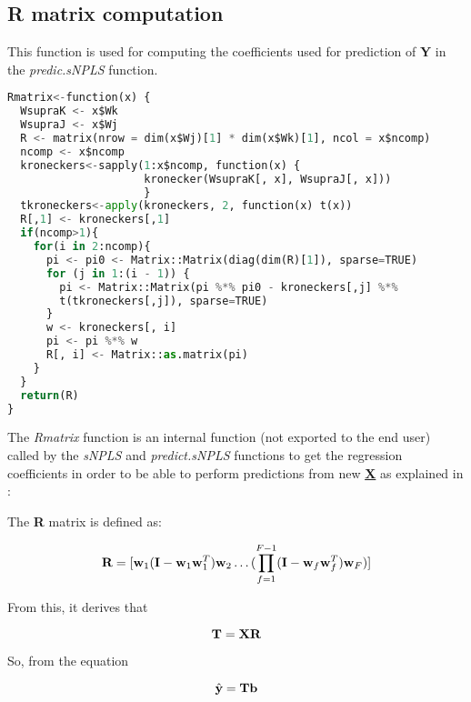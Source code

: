 \subsection{R matrix computation}
This function is used for computing the coefficients used for prediction of \textbf{Y} in the \textit{predic.sNPLS} function.
\vspace{15pt}
\begin{scriptsize}
\begin{lstlisting}[language=Python, caption=R matrix function]
Rmatrix<-function(x) {
  WsupraK <- x$Wk
  WsupraJ <- x$Wj
  R <- matrix(nrow = dim(x$Wj)[1] * dim(x$Wk)[1], ncol = x$ncomp)
  ncomp <- x$ncomp
  kroneckers<-sapply(1:x$ncomp, function(x) {
                     kronecker(WsupraK[, x], WsupraJ[, x]))
                     }
  tkroneckers<-apply(kroneckers, 2, function(x) t(x))
  R[,1] <- kroneckers[,1]
  if(ncomp>1){
    for(i in 2:ncomp){
      pi <- pi0 <- Matrix::Matrix(diag(dim(R)[1]), sparse=TRUE)
      for (j in 1:(i - 1)) {
        pi <- Matrix::Matrix(pi %*% pi0 - kroneckers[,j] %*% 
        t(tkroneckers[,j]), sparse=TRUE)
      }
      w <- kroneckers[, i]
      pi <- pi %*% w
      R[, i] <- Matrix::as.matrix(pi)
    }
  }
  return(R)
}

\end{lstlisting}
\end{scriptsize}

The \textit{Rmatrix} function is an internal function (not exported to the end user) called by the \textit{sNPLS} and \textit{predict.sNPLS} functions to get the regression coefficients in order to be able to perform predictions from new \textbf{\underline{X}} as explained in \parencite{leardi2005multi}:

The \textbf{R} matrix is defined as:

\begin{equation}
    \textbf{\text{R}}=[\textbf{\text{w}}_1(\textbf{\text{I}}-\textbf{\text{w}}_1\textbf{\text{w}}^T_1)\textbf{\text{w}}_2 \dots (\prod_{f=1}^{F-1}(\textbf{\text{I}}-\textbf{\text{w}}_f\textbf{\text{w}}^T_f)\textbf{\text{w}}_F)]
\end{equation}

From this, it derives that

\begin{equation}
    \textbf{\text{T}}=\textbf{\text{XR}}
\end{equation}

So, from the equation

\begin{equation}
    \hat{\textbf{\text{y}}}=\textbf{\text{Tb}}
\end{equation}

